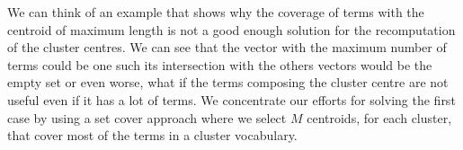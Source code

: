 \documentclass[runningheads]{llncs}
\begin{document}
We can think of an example that shows why the coverage of terms 
with the centroid of maximum length is not a good enough solution for
the recomputation of the cluster centres.
We can see
that the vector with the maximum number of terms
could be one such its intersection with the others vectors would be the empty set or even worse, what if the terms composing the
cluster centre are not useful even if it has a lot of terms. We concentrate our efforts
for solving the first case by using a set cover approach where
we select $M$ centroids, for each cluster, that cover most of the terms in a cluster vocabulary. 

%
%
%
%
\end{document}

